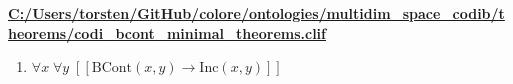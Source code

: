 \documentclass{article}
\begin{document}
\textbf{\url{C:/Users/torsten/GitHub/colore/ontologies/multidim\_space\_codib/theorems/codi\_bcont\_minimal\_theorems.clif}}

\begin{enumerate}
\item $\forall x\; \forall y\;  \left[ \left[ \textrm{BCont}(x,y) \rightarrow \textrm{Inc}(x,y) \right] \right]$
\end{enumerate}
\end{document}
